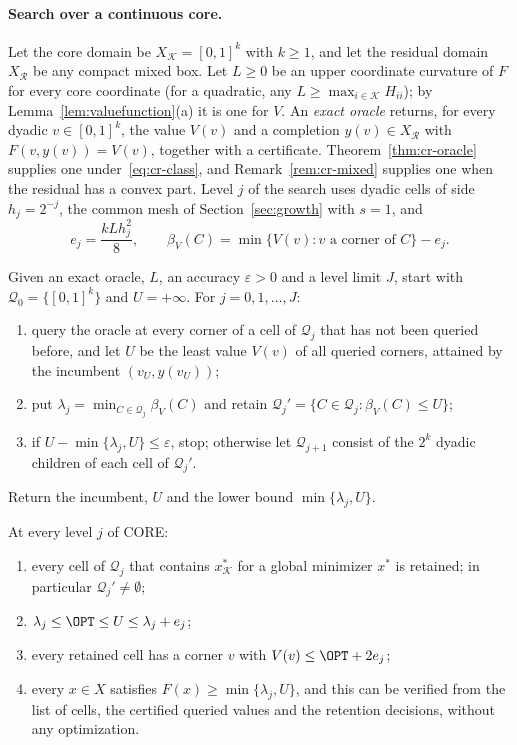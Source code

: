\paragraph{Search over a continuous core.}
Let the core domain be $X_{\mathcal K}=[0,1]^k$ with $k\ge1$, and let the
residual domain $X_{\mathcal R}$ be any compact mixed box. Let $L\ge0$ be an
upper coordinate curvature of $F$ for every core coordinate (for a
quadratic, any $L\ge\max_{i\in\mathcal K}H_{ii}$); by
Lemma~\ref{lem:valuefunction}(a) it is one for $V$. An \emph{exact oracle}
returns, for every dyadic $v\in[0,1]^k$, the value $V(v)$ and a completion
$y(v)\in X_{\mathcal R}$ with $F(v,y(v))=V(v)$, together with a certificate.
Theorem~\ref{thm:cr-oracle} supplies one under~\eqref{eq:cr-class}, and
Remark~\ref{rem:cr-mixed} supplies one when the residual has a convex part.
Level $j$ of the search uses dyadic cells of side $h_j=2^{-j}$, the common
mesh of Section~\ref{sec:growth} with $s=1$, and
\[
e_j=\frac{kLh_j^2}8,\qquad
\beta_V(C)=\min\{V(v):v\text{ a corner of }C\}-e_j .
\]

\begin{algorithm}\label{alg:core}
Given an exact oracle, $L$, an accuracy $\varepsilon>0$ and a level limit
$J$, start with $\mathcal Q_0=\{[0,1]^k\}$ and $U=+\infty$. For
$j=0,1,\dots,J$:
\begin{enumerate}[label=(\roman*)]
\item query the oracle at every corner of a cell of $\mathcal Q_j$ that has
not been queried before, and let $U$ be the least value $V(v)$ of all
queried corners, attained by the incumbent $(v_U,y(v_U))$;
\item put $\lambda_j=\min_{C\in\mathcal Q_j}\beta_V(C)$ and retain
$\mathcal Q_j'=\{C\in\mathcal Q_j:\beta_V(C)\le U\}$;
\item if $U-\min\{\lambda_j,U\}\le\varepsilon$, stop; otherwise let
$\mathcal Q_{j+1}$ consist of the $2^k$ dyadic children of each cell of
$\mathcal Q_j'$.
\end{enumerate}
Return the incumbent, $U$ and the lower bound $\min\{\lambda_j,U\}$.
\end{algorithm}

\begin{theorem}\label{thm:cr-search}
At every level $j$ of CORE:
\begin{enumerate}[label=(\alph*)]
\item every cell of $\mathcal Q_j$ that contains $x^*_{\mathcal K}$ for a
global minimizer $x^*$ is retained; in particular $\mathcal Q_j'\ne\emptyset$;
\item $\lambda_j\le\OPT\le U\le\lambda_j+e_j$;
\item every retained cell has a corner $v$ with $V(v)\le\OPT+2e_j$;
\item every $x\in X$ satisfies $F(x)\ge\min\{\lambda_j,U\}$, and this can be
verified from the list of cells, the certified queried values and the
retention decisions, without any optimization.
\end{enumerate}
\end{theorem}

